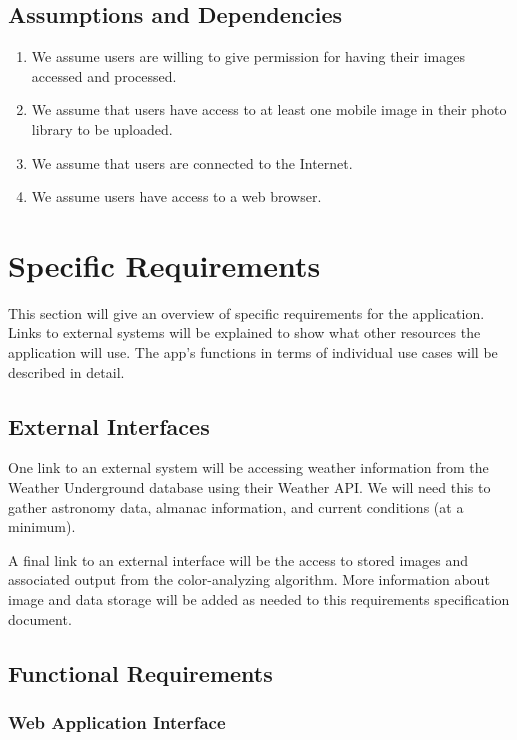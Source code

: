 \documentclass[letterpaper,10pt,draftclsnofoot,onecolumn]{IEEEtran}
\begin{document}
\begin{flushleft}
\subsection{Assumptions and Dependencies}
\begin{enumerate}
	\item We assume users are willing to give permission for having their images accessed and processed.
	\item We assume that users have access to at least one mobile image in their photo library to be uploaded.
	\item We assume that users are connected to the Internet.
	\item We assume users have access to a web browser.
\end{enumerate}

\section{Specific Requirements}
This section will give an overview of specific requirements for the application.
Links to external systems will be explained to show what other resources the application will use.
The app's functions in terms of individual use cases will be described in detail.

\subsection{External Interfaces}
One link to an external system will be accessing weather information from the Weather Underground database using their Weather API.
We will need this to gather astronomy data, almanac information, and current conditions (at a minimum).

A final link to an external interface will be the access to stored images and associated output from the color-analyzing algorithm.
More information about image and data storage will be added as needed to this requirements specification document.

\subsection{Functional Requirements}

\subsubsection{Web Application Interface} \ \\


\end{flushleft}
\end{document}
